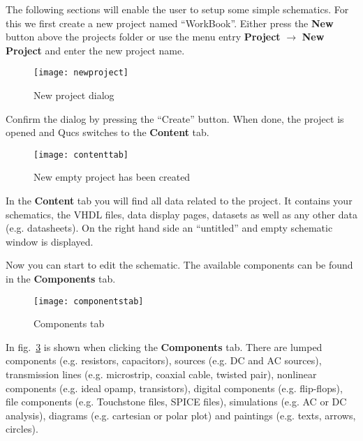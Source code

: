 
The following sections will enable the user to setup some simple
schematics.  For this we first create a new project named
``WorkBook''.  Either press the \textbf{New} button above the projects
folder or use the menu entry \textbf{Project} $\rightarrow$
\textbf{New Project} and enter the new project name.

\begin{figure}[ht]
  \centering
  \texttt{[image: newproject]}
  \caption{New project dialog}
  \label{fig:newproject}
\end{figure}
\FloatBarrier

Confirm the dialog by pressing the ``Create'' button.  When done, the
project is opened and Qucs switches to the \textbf{Content} tab.

\begin{figure}[ht]
  \centering
  \texttt{[image: contenttab]}
  \caption{New empty project has been created}
  \label{fig:contenttab}
\end{figure}
\FloatBarrier

In the \textbf{Content} tab you will find all data related to the
project.  It contains your schematics, the VHDL files, data display
pages, datasets as well as any other data (e.g. datasheets).  On the
right hand side an ``untitled'' and empty schematic window is
displayed.

\medskip

Now you can start to edit the schematic.  The available components can
be found in the \textbf{Components} tab.

\begin{figure}[ht]
  \centering
  \texttt{[image: componentstab]}
  \caption{Components tab}
  \label{fig:componentstab}
\end{figure}
\FloatBarrier

In fig.~\ref{fig:componentstab} is shown when clicking the
\textbf{Components} tab.  There are lumped components (e.g. resistors,
capacitors), sources (e.g. DC and AC sources), transmission lines
(e.g. microstrip, coaxial cable, twisted pair), nonlinear components
(e.g. ideal opamp, transistors), digital components (e.g. flip-flops),
file components (e.g. Touchstone files, SPICE files), simulations
(e.g. AC or DC analysis), diagrams (e.g. cartesian or polar plot) and
paintings (e.g. texts, arrows, circles).

\medskip

